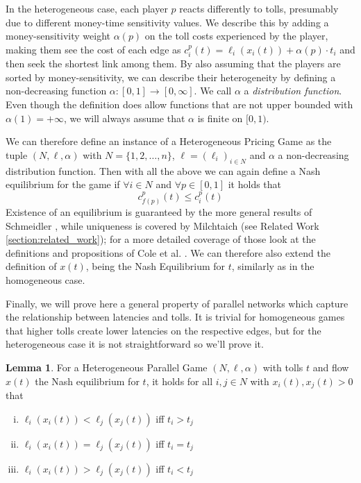 \documentclass[10pt,a4paper]{book}
\theoremstyle{definition}
\newtheorem{lemma}[definition]{Lemma}
\theoremstyle{comment}
\begin{document}
In the heterogeneous case, each player $p$ reacts differently to tolls, presumably due to different money-time sensitivity values.
We describe this by adding a money-sensitivity weight $\alpha(p)$ on the toll costs experienced by the player, making them see the cost of each edge as $c_i^p(t) = \ell_i(x_i(t)) + \alpha(p) \cdot t_i$ and then seek the shortest link among them.
By also assuming that the players are sorted by money-sensitivity, we can describe their heterogeneity by defining a non-decreasing function $\alpha: [0, 1] \rightarrow [0, \infty]$.
We call $\alpha$ a \textit{distribution function}.
Even though the definition does allow functions that are not upper bounded with $\alpha(1) = +\infty$, we will always assume that $\alpha$ is finite on $[0, 1)$.

We can therefore define an instance of a Heterogeneous Pricing Game as the tuple $(N, \ell, \alpha)$ with $N = \{1, 2, \dots, n\}$, $\ell = (\ell_i)_{i \in N}$ and $\alpha$ a non-decreasing distribution function.
Then with all the above we can again define a Nash equilibrium for the game if $\forall i \in N$ and $\forall p \in [0, 1]$ it holds that
\[c_{f(p)}^p(t) \leq c_i^p(t)\]
Existence of an equilibrium is guaranteed by the more general results of Schmeidler \cite[Thm 2]{1973JSP.....7..295S}, while uniqueness is covered by Milchtaich \cite[Prop 3.3]{doi:10.1287/moor.25.3.349.12220} (see Related Work \ref{section:related_work}); for a more detailed coverage of those look at the definitions and propositions of Cole et al. \cite[\S2]{10.1145/780542.780618}.
We can therefore also extend the definition of $x(t)$, being the Nash Equilibrium for $t$, similarly as in the homogeneous case.

Finally, we will prove here a general property of parallel networks which capture the relationship between latencies and tolls.
It is trivial for homogeneous games that higher tolls create lower latencies on the respective edges, but for the heterogeneous case it is not straightforward so we'll prove it.

\begin{lemma}
	\label{lemma:latencies_tolls}
	For a Heterogeneous Parallel Game $(N, \ell, \alpha)$ with tolls $t$ and flow $x(t)$ the Nash equilibrium for $t$, it holds for all $i, j \in N$ with $x_i(t), x_j(t) > 0$ that
	\begin{enumerate}[(i)]
		\item $\ell_i(x_i(t)) < \ell_j(x_j(t))$ iff $t_i > t_j$
		\item $\ell_i(x_i(t)) = \ell_j(x_j(t))$ iff $t_i = t_j$
		\item $\ell_i(x_i(t)) > \ell_j(x_j(t))$ iff $t_i < t_j$
	\end{enumerate}
\end{lemma}
\end{document}

